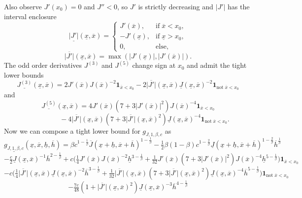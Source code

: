 \documentclass[12pt]{amsart}
\theoremstyle{plain}
\theoremstyle{definition}
\theoremstyle{remark}
\numberwithin{equation}{section}
\begin{document}
Also observe $J'(x_0)=0$ and $J''<0$, so $J'$ is strictly decreasing and $|J'|$ has the interval enclosure
\[ \underline{|J'|}(\underline{x},\overline{x})= \left\{
\begin{array}{ll}
J'(\overline{x}), & \text{if}\;\overline{x}<x_0,\\
-J'(\underline{x}), & \text{if}\;\underline{x}>x_0,\\
0, & \text{else},
\end{array}
\right.\]
\[ \overline{|J'|}(\underline{x},\overline{x}) = \max(|J'(\underline{x})|, |J'(\overline{x})|). \]
The odd order derivatives $J^{(3)}$ and $J^{(5)}$ change sign at $x_0$ and admit the tight lower bounds
\[ \underline{J^{(3)}}(\underline{x},\overline{x}) = 2 J'(\overline{x}) J(\overline{x})^{-2} \mathbf{1}_{\overline{x}<x_0} - 2 \overline{|J'|}(\underline{x},\overline{x}) \underline{J}(\underline{x},\overline{x})^{-2} \mathbf{1}_{\text{not}\;\overline{x}< x_0} \]
and
\[ \underline{J^{(5)}}(\underline{x},\overline{x}) = 4 J'(\overline{x})(7+3 |J'(\overline{x})|^2)J(\overline{x})^{-4}\mathbf{1}_{\overline{x}<x_0} \] 
\[\hspace{2cm}- 4 \overline{|J'|}(\underline{x},\overline{x})(7+3\overline{|J'|}(\underline{x},\overline{x})^2)\underline{J}(\underline{x},\overline{x})^{-4}\mathbf{1}_{\text{not}\;\overline{x}< x_0}. \]
Now we can compose a tight lower bound for $g_{J,1,\beta,c}$ as
\[ \underline{g_{J,1,\beta,c}}(\underline{x},\overline{x},\underline{h},\overline{h}) = \beta c^{1-\frac1\beta} \overline{J}(\underline{x}+\underline{h},\overline{x}+\overline{h})^{1-\frac1\beta} - \tfrac12 \beta(1-\beta)c^{1-\frac2\beta}\underline{J}(\underline{x}+\underline{h},\overline{x}+\overline{h})^{1-\frac2\beta}\overline{h}^{\frac1\beta} \]  
\[ - \tfrac{c}2  \underline{J}(\underline{x},\overline{x})^{-1} \overline{h}^{2-\frac1\beta} 
+c \Big(\tfrac14 J'(\overline{x}) J(\overline{x})^{-2}\underline{h}^{3-\frac1\beta} + \tfrac1{32}J'(\overline{x})(7+3 |J'(\overline{x})|^2)J(\overline{x})^{-4}\underline{h}^{5-\frac1\beta}\Big)\mathbf{1}_{\overline{x}<x_0}
\]
\[ - c\Big(\tfrac14 \overline{|J'|}(\underline{x},\overline{x}) \underline{J}(\underline{x},\overline{x})^{-2} \overline{h}^{3-\frac1\beta} +
\tfrac1{32} \overline{|J'|}(\underline{x},\overline{x})(7+3\overline{|J'|}(\underline{x},\overline{x})^2)\underline{J}(\underline{x},\overline{x})^{-4} \overline{h}^{5-\frac1\beta}
\Big)\mathbf{1}_{\text{not}\;\overline{x}< x_0} \]
\[ -\tfrac{7c}{48}(1+\overline{|J'|}(\underline{x},\overline{x})^2)\underline{J}(\underline{x},\overline{x})^{-3}\overline{h}^{4-\frac1\beta} \]
\end{document}
